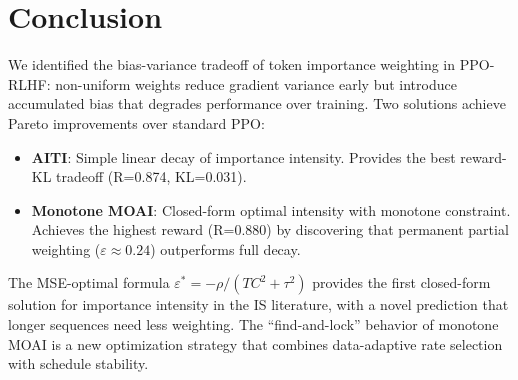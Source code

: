 \documentclass[11pt,a4paper]{article}
\begin{document}
\section{Conclusion}
\label{sec:conclusion}

We identified the bias-variance tradeoff of token importance weighting in PPO-RLHF: non-uniform weights reduce gradient variance early but introduce accumulated bias that degrades performance over training. Two solutions achieve Pareto improvements over standard PPO:

\begin{itemize}
    \item \textbf{AITI}: Simple linear decay of importance intensity. Provides the best reward-KL tradeoff (R=0.874, KL=0.031).
    \item \textbf{Monotone MOAI}: Closed-form optimal intensity with monotone constraint. Achieves the highest reward (R=0.880) by discovering that permanent partial weighting ($\varepsilon \approx 0.24$) outperforms full decay.
\end{itemize}

The MSE-optimal formula $\varepsilon^* = -\rho / (T C^2 + \tau^2)$ provides the first closed-form solution for importance intensity in the IS literature, with a novel prediction that longer sequences need less weighting. The ``find-and-lock'' behavior of monotone MOAI is a new optimization strategy that combines data-adaptive rate selection with schedule stability.


\end{document}
